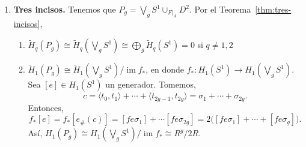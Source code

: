 \documentclass[11pt,a4paper]{article}
\theoremstyle{plain}
\theoremstyle{definition}
\theoremstyle{remark}
\newcommand{\ZZ}{\mathbb Z}
\DeclareMathOperator{\ran}{ran}
\DeclareMathOperator{\im}{im}
\begin{document}
\begin{enumerate}[label=\arabic*.,leftmargin=*]
\begin{enumerate}[label=\alph*)]
\begin{enumerate}[label=\arabic*)]
\[
\tilde H_1(T_g)\cong\tilde H_1\left(\bigvee_{2g}S^1\right)\Big/\im f_*\cong R^{2g}/0=R^{2g}.
\]
\item $0\to H_2\left(\bigvee_{2g}S^1\right)=0\to H_2(T_g)\xrightarrow{\cong}\ker f_*=R\to0$
\end{enumerate}
En resumen,
\[
H_q(T_g)=\begin{cases}R & q=0,2\\ R^{2g} & q=1\\0 & \text{e.o.c}\end{cases}
\]
\begin{itemize}
\item \textbf{Celular.} La descomposición celular de $T_g$ consiste de:
$\Gamma^0=\{e^0\}$, $\Gamma^1=\{e^1_{a_i}\cup e^1_{b_i}\}_{i=1}^g$,
$\Gamma^2=\{e^2\}$. Así, $T_g=\bigcup_{k=0}^2\Gamma^k$. Por lo tanto, por
el Teorema~\ref{thm:cw-celular}, se tiene que $H_q(T_g)=0$ para $q>2$. De
esta manera, se tiene la sucesión exacta:
\[
0\to R\xrightarrow{d_2}R^{2g}\xrightarrow{d_1}R\to0
\]
Por la Observación~\ref{obs:cw-observaciones} 3., ya que $\#\Gamma^0=1$, se
tiene que $d_1=0$. Calculemos $d_2$ mediante la fórmula del
Teorema~\ref{thm:grado-pegado}. Se tiene que
\[
d_2(e^2)=\sum_\beta d_{\alpha\beta}e^1_\beta
=e^1_{a_1}+e^1_{b_1}+\cdots+e^1_{a_g}+e^1_{b_g}-e^1_{a_1}-e^1_{b_1}-\cdots-e^1_{a_g}-e^1_{b_g}=0.
\]
Por lo tanto, $d_1=d_2=0$.
\[
\begin{aligned}
H_0(T_g)&=\ker d_0/\im d_1=R/0=R; \\
H_1(T_g)&=\ker d_1/\im d_2=R^{2g}; \\
H_2(T_g)&=\ker d_2/\im d_3=R/0=R.
\end{aligned}
\]
Finalmente,
\[
H_q(T_g)=\begin{cases}R & q=0,2\\ R^{2g} & q=1\\0 & \text{e.o.c.}\end{cases}
\]
\item \textbf{Cálculo de $\chi(T_g)$.}
\[
\chi(T_g)=\sum_{q\ge0}(-1)^q\ran\big(H_q(T_g;\ZZ)\big)=1-2g+1=2-2g.
\]
\end{itemize}
\item \textbf{Tres incisos.} Tenemos que $P_g=\bigvee_gS^1\cup_{F|_A}D^2$.
Por el Teorema~\ref{thm:tres-incisos},
\begin{enumerate}[label=\arabic*)]
\item $\tilde H_q(P_g)\cong\tilde H_q\left(\bigvee_gS^1\right)\cong\bigoplus_g\tilde H_q(S^1)=0$ si $q\ne1,2$
\item $\tilde H_1(P_g)\cong\tilde H_1\left(\bigvee_gS^1\right)/\im f_*$, en
donde $f_*:H_1(S^1)\to H_1\left(\bigvee_gS^1\right)$. Sea $[e]\in H_1(S^1)$
un generador. Tomemos,
\[
c=\langle t_0,t_1\rangle+\cdots+\langle t_{2g-1},t_{2g}\rangle=\sigma_1+\cdots+\sigma_{2g}.
\]
Entonces,
\[
f_*[e]=f_*[e_\#(c)]=[fe\sigma_1]+\cdots[fe\sigma_{2g}]=2\big([fe\sigma_1]+\cdots+[fe\sigma_g]\big).
\]
Así, $H_1(P_g)\cong H_1\left(\bigvee_gS^1\right)\Big/\im f_*\cong R^g/2R$.


\end{enumerate}
\end{enumerate}
\end{enumerate}
\end{document}
